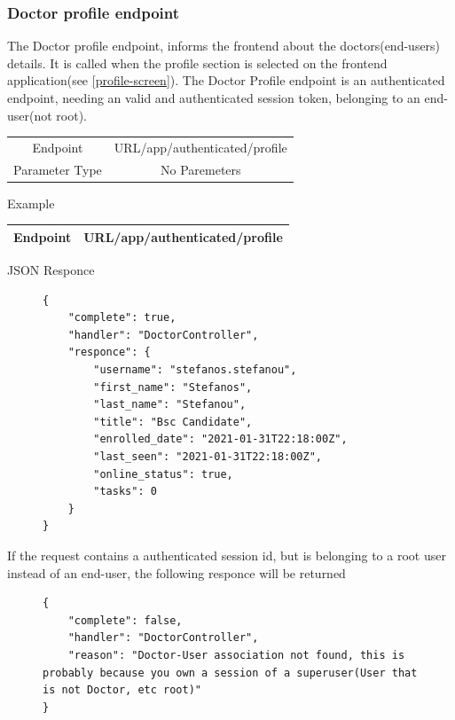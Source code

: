 				\subsubsection{Doctor profile endpoint}
					The Doctor profile endpoint, informs the frontend about the doctors(end-users) details. It is called when the profile section
					is selected on the frontend application(see \ref{profile-screen}). The Doctor Profile endpoint is an
					authenticated endpoint, needing an valid and authenticated session token, belonging to an end-user(not root).
					\begin{center}
						\begin{tabular}{ |c|c| } 
							\hline
							Endpoint & {{URL}}/app/authenticated/profile\\
							Parameter Type & No Paremeters  \\
							\hline
						\end{tabular}
					\end{center}
					Example
					\begin{center}
						\begin{tabular}{ |c|c| } 
							\hline
							Endpoint & {{URL}}/app/authenticated/profile\\
							\hline
						\end{tabular}
					\end{center}
					JSON Responce
					\begin{figure}[H]
						\iftrue
						\begin{lstlisting}[]
{
	"complete": true,
	"handler": "DoctorController",
	"responce": {
		"username": "stefanos.stefanou",
		"first_name": "Stefanos",
		"last_name": "Stefanou",
		"title": "Bsc Candidate",
		"enrolled_date": "2021-01-31T22:18:00Z",
		"last_seen": "2021-01-31T22:18:00Z",
		"online_status": true,
		"tasks": 0
	}
}
						\end{lstlisting}
					\end{figure}
					If the request contains a authenticated session id, but is belonging to a root user instead of an end-user, the
					following responce will be returned
					\begin{figure}[H]
						\iftrue
						\begin{lstlisting}[]
{
	"complete": false,
	"handler": "DoctorController",
	"reason": "Doctor-User association not found, this is probably because you own a session of a superuser(User that is not Doctor, etc root)"
}
						\end{lstlisting}
					\end{figure}
